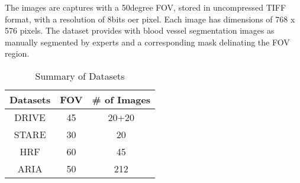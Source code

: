 The images are captures with a 50degree FOV, stored in uncompressed TIFF format, with a resolution of 8bits oer pixel. Each image has dimensions of 768 x 576 pixels. The dataset provides with blood vessel segmentation images as manually segmented by experts and a corresponding mask delinating the FOV region.



\begin{table}
\caption{Summary of Datasets}
\centering
\label{table:datasets}
\begin{tabular}{c c c }
\toprule
{Datasets} & {FOV} &{\# of Images}  \\ \hline

DRIVE & 45 & 20+20 \\

STARE& 30 & 20  \\

HRF & 60 & 45  \\

ARIA & 50 & 212 \\

\bottomrule
\end{tabular}
\end{table}
